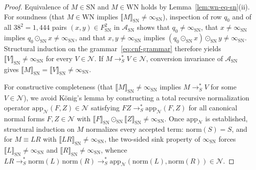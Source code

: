 \documentclass[11pt,reqno]{amsart}
\numberwithin{equation}{section}
\theoremstyle{plain}
\theoremstyle{definition}
\theoremstyle{remark}
\newcommand{\SN}{\mathrm{SN}}
\newcommand{\WN}{\mathrm{WN}}
\newcommand{\sem}[1]{\llbracket #1 \rrbracket}
\newcommand{\redSs}{\to_S^*}
\begin{document}
\begin{proof}
Equivalence of $M \in \SN$ and $M \in \WN$ holds by Lemma~\ref{lem:wn-eq-sn}(ii). For soundness (that $M \in \WN$ implies $\sem{M}_{\SN} \neq \infty_{\SN}$), inspection of row $q_0$ and of all $38^2 = 1{,}444$ pairs $(x, y) \in F_{\SN}^2$ in $\mathcal{A}_{\SN}$ shows that $q_0 \neq \infty_{\SN}$, that $x \neq \infty_{\SN}$ implies $q_0 \odot_{\SN} x \neq \infty_{\SN}$, and that $x, y \neq \infty_{\SN}$ implies $(q_0 \odot_{\SN} x) \odot_{\SN} y \neq \infty_{\SN}$. Structural induction on the grammar~\eqref{eq:cnf-grammar} therefore yields $\sem{V}_{\SN} \neq \infty_{\SN}$ for every $V \in \mathcal{N}$. If $M \redSs V \in \mathcal{N}$, conversion invariance of $\mathcal{A}_{\SN}$ gives $\sem{M}_{\SN} = \sem{V}_{\SN} \neq \infty_{\SN}$.

For constructive completeness (that $\sem{M}_{\SN} \neq \infty_{\SN}$ implies $M \redSs V$ for some $V \in \mathcal{N}$), we avoid K\"onig's lemma by constructing a total recursive normalization operator $\mathrm{app}_{\mathcal{N}}(F, Z) \in \mathcal{N}$ satisfying $F Z \redSs \mathrm{app}_{\mathcal{N}}(F, Z)$ for all canonical normal forms $F, Z \in \mathcal{N}$ with $\sem{F}_{\SN} \odot_{\SN} \sem{Z}_{\SN} \neq \infty_{\SN}$. Once $\mathrm{app}_{\mathcal{N}}$ is established, structural induction on $M$ normalizes every accepted term: $\mathrm{norm}(S) = S$, and for $M \equiv L R$ with $\sem{L R}_{\SN} \neq \infty_{\SN}$, the two-sided sink property of $\infty_{\SN}$ forces $\sem{L}_{\SN} \neq \infty_{\SN}$ and $\sem{R}_{\SN} \neq \infty_{\SN}$, whence $L R \redSs \mathrm{norm}(L)\,\mathrm{norm}(R) \redSs \mathrm{app}_{\mathcal{N}}(\mathrm{norm}(L), \mathrm{norm}(R)) \in \mathcal{N}$.


\end{proof}
\end{document}

